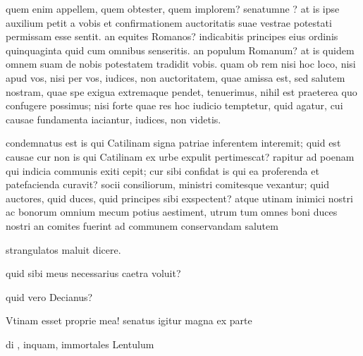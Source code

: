  quem enim appellem, quem obtester, quem implorem? senatumne ? at is ipse auxilium petit a vobis et confirmationem auctoritatis suae vestrae potestati permissam esse sentit. an equites Romanos? indicabitis principes eius ordinis quinquaginta quid cum omnibus senseritis. an populum Romanum? at is quidem omnem suam de nobis potestatem tradidit vobis. quam ob rem nisi hoc loco, nisi apud vos, nisi per vos, iudices, non auctoritatem, quae amissa est, sed salutem nostram, quae spe exigua extremaque pendet, tenuerimus, nihil est praeterea quo confugere possimus; nisi forte quae res hoc iudicio temptetur, quid agatur, cui causae fundamenta iaciantur, iudices, non videtis.

 condemnatus est is qui Catilinam signa patriae inferentem interemit; quid est causae cur non is qui Catilinam ex urbe expulit pertimescat? rapitur ad poenam qui indicia communis exiti cepit; cur sibi confidat is qui ea proferenda et patefacienda curavit? socii consiliorum, ministri comitesque vexantur; quid auctores, quid duces, quid principes sibi exspectent? atque utinam inimici nostri ac bonorum omnium mecum potius aestiment, utrum tum omnes boni duces nostri an comites fuerint ad communem conservandam salutem

 strangulatos maluit dicere.

 quid sibi meus necessarius caetra voluit?

 quid vero Decianus?

 Vtinam esset proprie mea! senatus igitur magna ex parte

 di , inquam, immortales Lentulum

